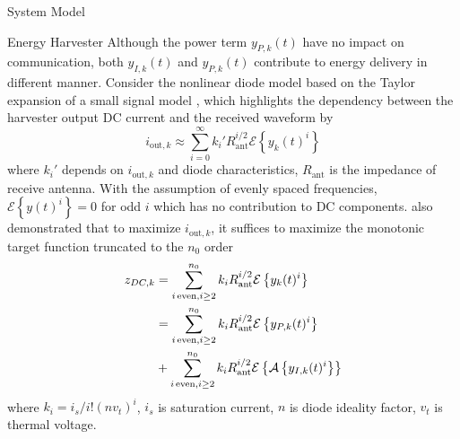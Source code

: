 \documentclass{IEEEtran}
\begin{document}
\begin{section} {System Model}
	\begin{subsection}	{Energy Harvester}
		Although the power term $y_{P,k}(t)$ have no impact on communication, both $y_{I,k}(t)$ and $y_{P,k}(t)$ contribute to energy delivery in different manner. Consider the nonlinear diode model based on the Taylor expansion of a small signal model \cite{Clerckx2018b,Clerckx2016a}, which highlights the dependency between the harvester output DC current and the received waveform by
		\begin{equation}	\label{eq:i_k}
			i_{\text{out},k}\approx\sum_{i=0}^{\infty}{k_i'}{R_{\text{ant}}^{i/2}}{\mathcal{E}\left\{y_k(t)^i\right\}}
		\end{equation}
		where $k_i'$ depends on $i_{\text{out},k}$ and diode characteristics, $R_{\text{ant}}$ is the impedance of receive antenna. With the assumption of evenly spaced frequencies, $\mathcal{E}\left\{y(t)^i\right\}=0$ for odd $i$ which has no contribution to DC components. \cite{Clerckx2016a} also demonstrated that to maximize $i_{\text{out},k}$, it suffices to maximize the monotonic target function truncated to the $n_0$ order
		\begin{equation}	\label{eq:z_{DC,k}}
			\begin{split}
				z_{DC,k}
				&=\sum_{i\,\text{even},i\ge2}^{n_0}{k_i}{R_{\text{ant}}^{i/2}}{\mathcal{E}\left\{y_k(t)^i\right\}}	\\
				&=\sum_{i\,\text{even},i\ge2}^{n_0}{k_i}{R_{\text{ant}}^{i/2}}{\mathcal{E}\left\{y_{P,k}(t)^i\right\}}	\\
				&+\sum_{i\,\text{even},i\ge2}^{n_0}{k_i}{R_{\text{ant}}^{i/2}}{\mathcal{E}\left\{\mathcal{A}\left\{y_{I,k}(t)^i\right\}\right\}}
			\end{split}
		\end{equation}
		where $k_i=i_s/i!(nv_t)^i$, $i_s$ is saturation current, $n$ is diode ideality factor, $v_t$ is thermal voltage.


	\end{subsection}
\end{section}



\end{document}
